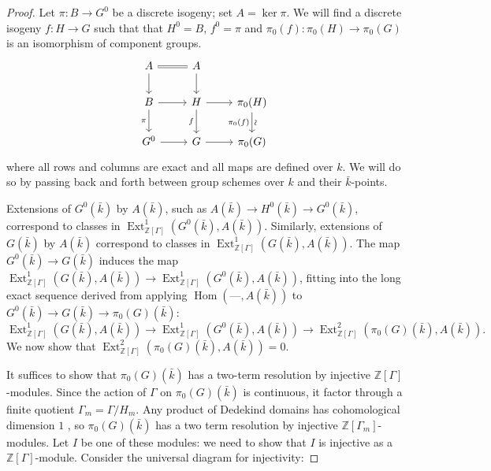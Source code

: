 \documentclass[11pt]{amsart}
\theoremstyle{plain}
\theoremstyle{definition}
\theoremstyle{remark}
\newcommand{\ZZ}{{\mathbb{Z}}}
\newcommand{\bFq}{\bar{k}}
\newcommand{\Fq}{k}
\DeclareMathOperator{\Hom}{Hom}
\DeclareMathOperator{\Ext}{Ext}
\newcommand\David[1]{\marginpar{\smaller\smaller DR: #1}}
\begin{document}
\begin{proof}
Let $\pi: B \to G^0$ be a discrete isogeny; set $A = \ker \pi$.
  We will find a discrete isogeny $f: H\to G$
  such that that $H^0 = B$, $f^0 =\pi$ and
  $\pi_0(f) : \pi_0(H)\to \pi_0(G)$ is an isomorphism of component
  groups.
  \begin{equation}\label{extension-diagram}
  \begin{tikzcd}
  A \arrow[equal]{r} \dar & A \dar \\
  B \rar \dar[swap]{\pi} & H \rar \dar[swap]{f} & \pi_0(H) \arrow{d}[below,rotate=90]{\sim}[swap]{\pi_0(f)} \\
  G^0 \rar & G \rar & \pi_0(G)
  \end{tikzcd}
  \end{equation}
  where all rows and columns are exact and all maps are defined over
  $\Fq$.  We will do so by passing back and forth between group
  schemes over $\Fq$ and their $\bFq$-points.  
  
  Extensions of
  $G^0(\bFq)$ by $A(\bFq)$, such as $A(\bFq) \to H^0(\bFq) \to G^0(\bFq)$,
  correspond to classes in $\Ext^1_{\ZZ[\Gamma]}(G^0(\bFq), A(\bFq))$.
  Similarly, extensions of $G(\bFq)$ by $A(\bFq)$ correspond to
  classes in $\Ext^1_{\ZZ[\Gamma]}(G(\bFq), A(\bFq))$.  The map
  $G^0(\bFq) \to G(\bFq)$ induces the map
  $\Ext^1_{\ZZ[\Gamma]}(G(\bFq), A(\bFq)) \to \Ext^1_{\ZZ[\Gamma]}(G^0(\bFq), A(\bFq))$,
  fitting into the long exact sequence derived from applying
  $\Hom(\mbox{---}, A(\bFq))$ to $G^0(\bFq) \to G(\bFq) \to \pi_0(G)(\bFq)$:
  $$\Ext^1_{\ZZ[\Gamma]}(G(\bFq), A(\bFq)) \to \Ext^1_{\ZZ[\Gamma]}(G^0(\bFq), A(\bFq)) \to \Ext^2_{\ZZ[\Gamma]}(\pi_0(G)(\bFq), A(\bFq)).$$
  We now show that $\Ext^2_{\ZZ[\Gamma]}(\pi_0(G)(\bFq), A(\bFq)) = 0$.

  It suffices to show that $\pi_0(G)(\bFq)$ has a two-term resolution
  by injective $\ZZ[\Gamma]$-modules.  Since the action of $\Gamma$ on
  $\pi_0(G)(\bFq)$ is continuous, it factor through a finite quotient
  $\Gamma_m = \Gamma / H_m$.  Any product of Dedekind domains has
  cohomological dimension $1$ \David{Add a citation for this fact}, so $\pi_0(G)(\bFq)$ has a
  two term resolution by injective $\ZZ[\Gamma_m]$-modules.  Let $I$
  be one of these modules: we need to show that $I$ is injective as a
  $\ZZ[\Gamma]$-module.  Consider the universal diagram for injectivity:
  

\end{proof}
\end{document}
